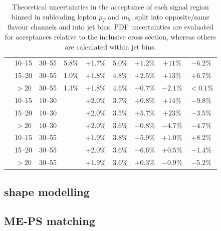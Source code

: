 \begin{table}
\begin{tabular}{ccc|cccccc}
		& 10--15 & 30--55 & 5.8\% & +1.7\% & 5.0\% & $+1.2\%$ & $+11\%$  & $-6.2\%$ \\
		& 15--20 & 30--55 & 1.0\% & +1.8\% & 4.8\% & $+2.5\%$ & $+13\%$  & $+6.7\%$  \\
		&  $>20$ & 30--55 & 1.3\% & +1.8\% & 4.6\% & $-0.7\%$ & $-2.1\%$ & $<0.1\%$ \\
		\hline
		\multirow{6}{*}{\twojet}
	    & 10--15 & 10--30 &       & +2.0\% & 3.7\% & $+0.8\%$ & $+14\%$  & $-9.8\%$ \\
		& 15--20 & 10--30 &       & +2.0\% & 3.5\% & $+5.7\%$ & $+23\%$  & $-3.5\%$  \\
		&  $>20$ & 10--30 &       & +2.0\% & 3.6\% & $-0.8\%$ & $-4.7\%$ & $-4.7\%$ \\
		& 10--15 & 30--55 &       & +1.9\% & 3.8\% & $-5.9\%$ & $+1.0\%$ & $+8.2\%$ \\
		& 15--20 & 30--55 &       & +2.0\% & 3.6\% & $-6.6\%$ & $+0.5\%$ & $-1.4\%$ \\
		&  $>20$ & 30--55 &       & +1.9\% & 3.6\% & $+0.3\%$ & $-0.9\%$ & $-5.2\%$ \\
	\end{tabular}
	\caption{Theoretical uncertainties in the acceptance of each signal region binned in 
	subleading lepton $p_T$ and $m_{ll}$, split into opposite/same flavour channels and into jet bins.
	PDF uncertainties are evaluated for acceptances relative to the inclusive cross section, whereas 
	others are calculated within jet bins.}
	\label{tab:ggf_acc_unc_binned}
\end{table}





\subsection{\mt shape modelling}



\subsection{ME-PS matching}

